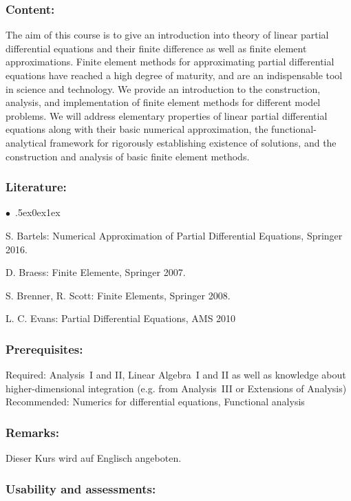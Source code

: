 \documentclass[a4paper,10pt]{article}
\renewenvironment{itemize}{\begin{list}{$\bullet$\ }{\itemsep.5ex\setlength{\topsep}{0.5\itemsep}\parsep0ex\labelsep1ex\settowidth{\labelwidth}{$\bullet$\ }\setlength{\leftmargin}{\labelwidth}\addtolength{\leftmargin}{3ex}\addtolength{\leftmargin}{\labelsep}}}{\end{list}}
\begin{document}
\subsubsection*{\large
    Content:
}
The aim of this course is to give an introduction into theory of linear partial differential equations and their finite difference as well as finite element approximations. Finite element methods for approximating partial differential equations have reached a high degree of maturity, and are an indispensable tool in science and technology. We provide an introduction to the construction, analysis, and implementation of finite element methods for different model problems. We will address elementary properties of linear partial differential equations along with their basic numerical approximation, the functional-analytical framework for rigorously establishing existence of solutions, and the construction and analysis of basic finite element methods.
\subsubsection*{\large
    Literature:
}
\begin{itemize}
\item  S. Bartels: Numerical Approximation of Partial Differential Equations, Springer 2016. 
\item  D. Braess: Finite Elemente, Springer 2007. 
\item  S. Brenner, R. Scott: Finite Elements, Springer 2008. 
\item  L. C. Evans: Partial Differential Equations, AMS 2010
\end{itemize}
\subsubsection*{\large
    Prerequisites:
}
Required: Analysis~I and II, Linear Algebra~I and II as well as knowledge about higher-dimensional integration (e.g. from Analysis~III or Extensions of Analysis) \\
Recommended:  Numerics for differential equations, Functional analysis
\subsubsection*{\large
    Remarks:
}
Dieser Kurs wird auf Englisch angeboten.
\subsubsection*{\large
    Usability and assessments:
}
\end{document}
